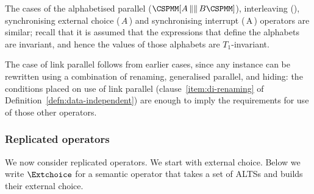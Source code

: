 


The cases of the alphabetised parallel 
($\M{[} A\, {\|\|}\, B \M{]} $),
interleaving (\CSPM{\|\|\|}), synchronising external choice
(\CSPM{[+}\,$A$\,\CSPM{+]}) and synchronising interrupt
(\CSPM{/+}\,A\,\CSPM{+\\}) operators are similar; recall that it is assumed
that the expressions that define the alphabets are invariant, and hence the
values of those alphabets are $T_1$-invariant.

The case of  link parallel follows from earlier cases, since any instance can
be rewritten using a combination of renaming, generalised parallel, and
hiding: the conditions placed on use of link parallel
(clause~\ref{item:di-renaming} of Definition~\ref{defn:data-independent}) are
enough to imply the requirements for use of those other operators.




\subsubsection{Replicated operators}  
\label{sec:replicated}

We now consider replicated operators.  We start with external choice.  Below
we write $\Extchoice$ for a semantic operator that takes a set of ALTSs and
builds their external choice.




